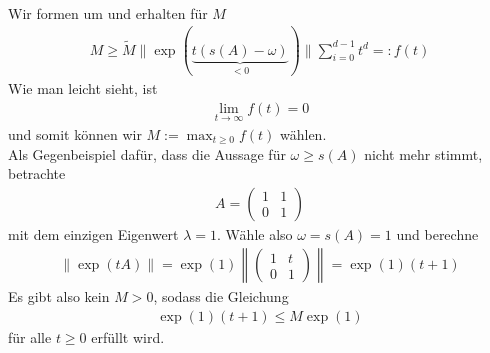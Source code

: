 \begin{solution}
\begin{align*}
\end{align*}
Wir formen um und erhalten für $M$
\begin{align*}
  M\geq \widetilde{M} \|\exp(\underbrace{t(s(A) - \omega)}_{< 0})\|\sum_{i=0}^{d-1} t^d =: f(t)
\end{align*}
Wie man leicht sieht, ist
\begin{align*}
  \lim_{t \to \infty}f(t) = 0
\end{align*}
und somit können wir $M := \max_{t \geq 0} f(t)$ wählen. \\
Als Gegenbeispiel dafür, dass die Aussage für $\omega \geq s(A)$ nicht mehr stimmt,
betrachte
\begin{align*}
  A = \begin{pmatrix}
    1 & 1 \\ 0 & 1
  \end{pmatrix}
\end{align*}
mit dem einzigen Eigenwert $\lambda = 1$. Wähle also $\omega = s(A) = 1$ und berechne
\begin{align*}
  \|\exp(tA)\| = \exp(1)\left\|\begin{pmatrix}
    1 & t \\ 0 & 1
  \end{pmatrix}\right\|
  = \exp(1)(t+1)
\end{align*}
Es gibt also kein $M > 0$, sodass die Gleichung
\begin{align*}
  \exp(1)(t+1) \leq M \exp(1)
\end{align*}
für alle $t \geq 0$ erfüllt wird.
\end{solution}

